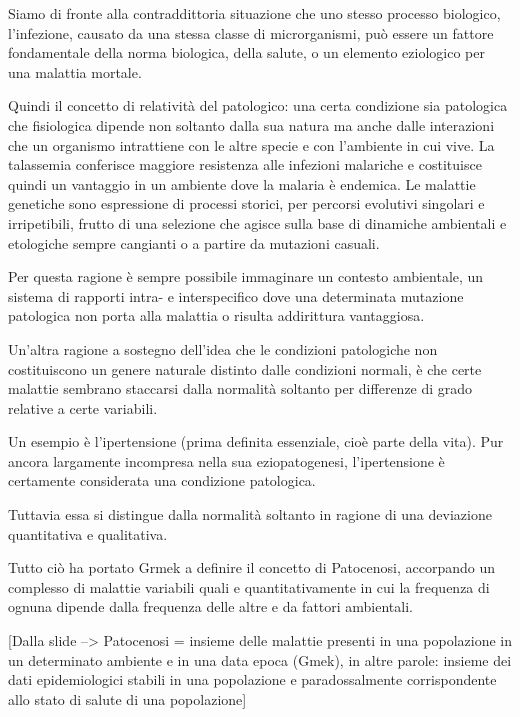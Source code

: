   Siamo di fronte alla contraddittoria situazione che uno stesso
  processo biologico, l'infezione, causato da una stessa classe di
  microrganismi, può essere un fattore fondamentale della norma
  biologica, della salute, o un elemento eziologico per una malattia
  mortale.

  Quindi il concetto di relatività del patologico: una certa condizione
  sia patologica che fisiologica dipende non soltanto dalla sua natura
  ma anche dalle interazioni che un organismo intrattiene con le altre
  specie e con l'ambiente in cui vive. La talassemia conferisce maggiore
  resistenza alle infezioni malariche e costituisce quindi un vantaggio
  in un ambiente dove la malaria è endemica. Le malattie genetiche sono
  espressione di processi storici, per percorsi evolutivi singolari e
  irripetibili, frutto di una selezione che agisce sulla base di
  dinamiche ambientali e etologiche sempre cangianti o a partire da
  mutazioni casuali.

  Per questa ragione è sempre possibile immaginare un contesto
  ambientale, un sistema di rapporti intra- e interspecifico dove una
  determinata mutazione patologica non porta alla malattia o risulta
  addirittura vantaggiosa.

  Un'altra ragione a sostegno dell'idea che le condizioni patologiche
  non costituiscono un genere naturale distinto dalle condizioni
  normali, è che certe malattie sembrano staccarsi dalla normalità
  soltanto per differenze di grado relative a certe variabili.

  Un esempio è l'ipertensione (prima definita essenziale, cioè parte
  della vita). Pur ancora largamente incompresa nella sua
  eziopatogenesi, l'ipertensione è certamente considerata una condizione
  patologica.

  Tuttavia essa si distingue dalla normalità soltanto in ragione di una
  deviazione quantitativa e qualitativa.

  Tutto ciò ha portato Grmek a definire il concetto di Patocenosi,
  accorpando un complesso di malattie variabili quali e
  quantitativamente in cui la frequenza di ognuna dipende dalla
  frequenza delle altre e da fattori ambientali.

  {[}Dalla slide --\textgreater{} Patocenosi = insieme delle malattie
  presenti in una popolazione in un determinato ambiente e in una data
  epoca (Gmek), in altre parole: insieme dei dati epidemiologici stabili
  in una popolazione e paradossalmente corrispondente allo stato di
  salute di una popolazione{]}

